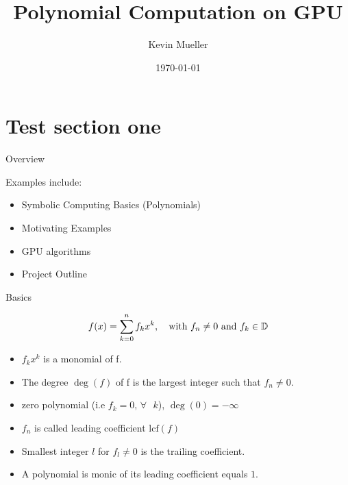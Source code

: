 \documentclass{beamer}
\title[GPU polynomial computation]{Polynomial Computation on GPU} %
\author{Kevin Mueller} %
\institute[UW] %
{
	\\ %
	\medskip
}
\date{\today} %
\begin{document}
	
	\begin{frame}
		\maketitle
	
		
	\end{frame}
	
	\section{Test section one}
	\begin{frame}
		\begin{center}
			\Huge Overview
		\end{center}
	
		\vspace{0.2in}
		Examples include:
		\begin{itemize}
			\item Symbolic Computing Basics (Polynomials)
			\item Motivating Examples
			\item GPU algorithms
			\item Project Outline
		\end{itemize}
		
	\end{frame}
	
	
	\begin{frame}
		\begin{center}
		\Huge Basics
		\end{center}
		\begin{align*}
		f(x) = \sum_{k=0}^{n} f_kx^k,\quad \text{with } f_n \ne 0 \space \text{ and } f_k \in \mathbb{D}
		\end{align*}
		
		\begin{itemize}
			\item $f_kx^k$ is a monomial of f.
			\item The degree $\deg(f)$ of f is the largest integer such that $f_n \ne 0$.
			\item zero polynomial (i.e $f_k = 0 \text{, } \forall \text{ }k$), $\deg(0) = -\infty$
			\item $f_n$ is called leading coefficient $\text{lcf}(f)$
			\item Smallest integer $l$ for $f_l \neq 0$ is the trailing coefficient.
			\item A polynomial is monic of its leading coefficient equals $1$.
		\end{itemize} 
		
	\end{frame}
	
\end{document}
